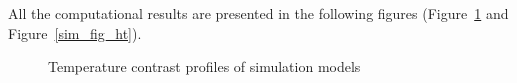 \documentclass{tQRT2e}
\begin{document}
All the computational results are presented in the following figures (Figure~\ref{sim_fig_stat} and Figure~\ref{sim_fig_ht}).
\begin{figure}
    \hspace{-15pt}
	\caption{Temperature contrast profiles of simulation models}
	\label{sim_fig_stat}
\end{figure}
\end{document}
